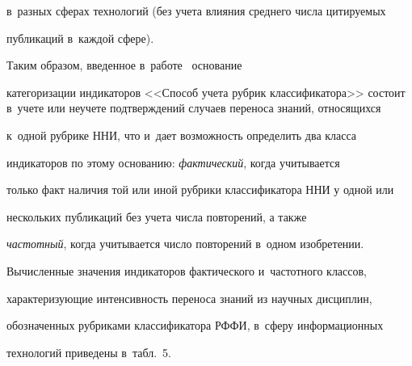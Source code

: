 в~разных сферах технологий (без учета влияния среднего числа цитируемых 


публикаций в~каждой сфере).


     


     Таким образом, введенное в~работе~\cite{19-mm} основание 


категоризации индикаторов <<Способ учета рубрик классификатора>> состоит в~учете или неучете подтверждений случаев переноса знаний, относящихся 


к~одной рубрике ННИ, что и~дает возможность определить два класса 


индикаторов по этому основанию: \textit{фактический}, когда учитывается 


только факт наличия той или иной рубрики классификатора ННИ у одной или 


нескольких публикаций без учета числа повторений, а также 


\textit{частотный}, когда учитывается число повторений в~одном изобретении. 


Вычисленные значения индикаторов фактического и~частотного классов, 


характеризующие интенсивность переноса знаний из научных дисциплин, 


обозначенных рубриками классификатора РФФИ, в~сферу информационных 


технологий приведены в~табл.~5.


     


